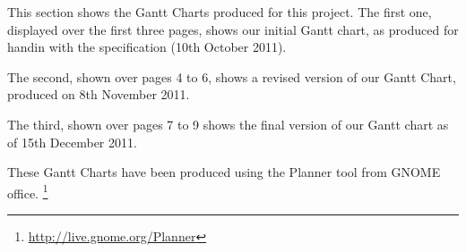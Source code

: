 \label{appendix:gantt}
This section shows the Gantt Charts produced for this project. The first one, 
displayed over the first three pages, shows our initial Gantt chart, as 
produced for handin with the specification (10th October 2011).

The second, shown over pages 4 to 6, shows a revised version of our Gantt 
Chart, produced on 8th November 2011.

The third, shown over pages 7 to 9 shows the final version of our Gantt chart as of
15th December 2011.

These Gantt Charts have been produced using the Planner tool from GNOME office.
\footnote{\url{http://live.gnome.org/Planner}}




